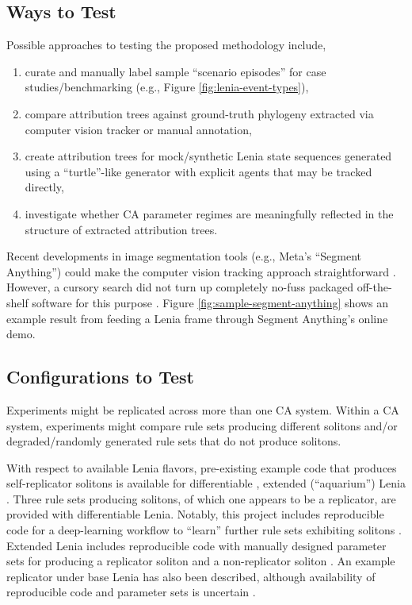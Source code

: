 \subsection{Ways to Test}

Possible approaches to testing the proposed methodology include,
\begin{enumerate}
\item curate and manually label sample ``scenario episodes'' for case studies/benchmarking (e.g., Figure \ref{fig:lenia-event-types}),
\item compare attribution trees against ground-truth phylogeny extracted via computer vision tracker or manual annotation,
\item create attribution trees for mock/synthetic Lenia state sequences generated using a ``turtle''-like generator with explicit agents that may be tracked directly,
\item investigate whether CA parameter regimes are meaningfully reflected in the structure of extracted attribution trees.
\end{enumerate}



Recent developments in image segmentation tools (e.g., Meta's ``Segment Anything'') could make the computer vision tracking approach straightforward \citep{kirillov2023segment}.
However, a cursory search did not turn up completely no-fuss packaged off-the-shelf software for this purpose \citep{cheng2023segment,yang2023track}.
Figure \ref{fig:sample-segment-anything} shows an example result from feeding a Lenia frame through Segment Anything's online demo.

\subsection{Configurations to Test}

Experiments might be replicated across more than one CA system.
Within a CA system, experiments might compare rule sets producing different solitons and/or degraded/randomly generated rule sets that do not produce solitons.

With respect to available Lenia flavors, pre-existing example code that produces self-replicator solitons is available for differentiable \citep{hamon2022learning}, extended (``aquarium'') Lenia \citep{chan2020lenia}.
Three rule sets producing solitons, of which one appears to be a replicator, are provided with differentiable Lenia.
Notably, this project includes reproducible code for a deep-learning workflow to ``learn'' further rule sets exhibiting solitons \citep{hamon2022learning}.
Extended Lenia includes reproducible code with manually designed parameter sets for producing a replicator soliton and a non-replicator soliton \citep{chan2020lenia}.
An example replicator under base Lenia has also been described, although availability of reproducible code and parameter sets is uncertain \citep{chan2019lenia}.

